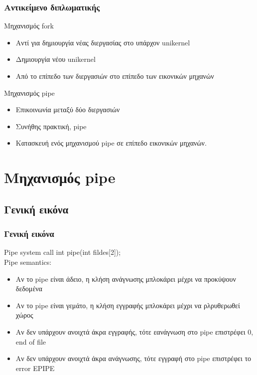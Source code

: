 \documentclass[red,slidestop,notes,compress,mathserif]{beamer}
\begin{document}
\begin{frame}
\frametitle{Αντικείμενο διπλωματικής}
\begin{block}{Μηχανισμός fork}
\begin{itemize}
\item Αντί για δημιουργία νέας διεργασίας στο υπάρχον unikernel
\item Δημιουργία νέου unikernel
\item Από το επίπεδο των διεργασιών στο επίπεδο των εικονικών μηχανών
\end{itemize}
\end{block}
\begin{block}{Μηχανισμός pipe}
\begin{itemize}
\item Επικοινωνία μεταξύ δύο διεργασιών
\item Συνήθης πρακτική, pipe
\item Κατασκευή ενός μηχανισμού pipe σε επίπεδο εικονικών μηχανών. 
\end{itemize}
\end{block}
\end{frame}

\section{Μηχανισμός pipe}
\subsection{Γενική εικόνα}

\begin{frame}
\frametitle{Γενική εικόνα}
\begin{block}{Pipe system call}
int pipe(int fildes[2]); \\
Pipe semantics:
\begin{itemize}
\item Αν το pipe είναι άδειο, η κλήση ανάγνωσης μπλοκάρει μέχρι να προκύψουν δεδομένα
\item Αν το pipe είναι γεμάτο, η κλήση εγγραφής μπλοκάρει μέχρι να ρλρυθερωθεί χώρος
\item Αν δεν υπάρχουν ανοιχτά άκρα εγγραφής, τότε εανάγνωση στο pipe επιστρέφει 0, end of file
\item Αν δεν υπάρχουν ανοιχτά άκρα ανάγνωσης, τότε εγγραφή στο pipe επιστρέφει το error EPIPE
\end{itemize}
\end{block}
\end{frame}
\end{document}
